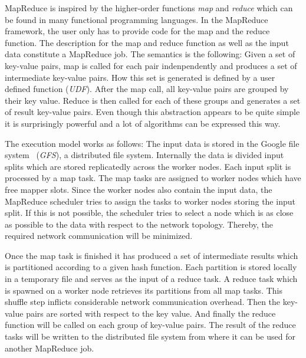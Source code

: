 MapReduce is inspired by the higher-order functions \emph{map} and \emph{reduce} which can be found in many functional programming languages.
In the MapReduce framework, the user only has to provide code for the map and the reduce function.
The description for the map and reduce function as well as the input data constitute a MapReduce job.
The semantics is the following:
Given a set of key-value pairs, map is called for each pair indenpendently and produces a set of intermediate key-value pairs.
How this set is generated is defined by a user defined function (\emph{UDF}).
After the map call, all key-value pairs are grouped by their key value.
Reduce is then called for each of these groups and generates a set of result key-value pairs.
Even though this abstraction appears to be quite simple it is surprisingly powerful and a lot of algorithms can be expressed this way.

The execution model works as follows:
The input data is stored in the Google file system~\cite{ghemawat:2003a} (\emph{GFS}), a distributed file system.
Internally the data is divided input splits which are stored replicatedly across the worker nodes.
Each input split is processed by a map task.
The map tasks are assigned to worker nodes which have free mapper slots.
Since the worker nodes also contain the input data, the MapReduce scheduler tries to assign the tasks to worker nodes storing the input split.
If this is not possible, the scheduler tries to select a node which is as close as possible to the data with respect to the network topology.
Thereby, the required network communication will be minimized.

Once the map task is finished it has produced a set of intermediate results which is partitioned according to a given hash function.
Each partition is stored locally in a temporary file and serves as the input of a reduce task.
A reduce task which is spawned on a worker node retrieves its partitions from all map tasks.
This shuffle step inflicts considerable network communication overhead.
Then the key-value pairs are sorted with respect to the key value.
And finally the reduce function will be called on each group of key-value pairs.
The result of the reduce tasks will be written to the distributed file system from where it can be used for another MapReduce job.

